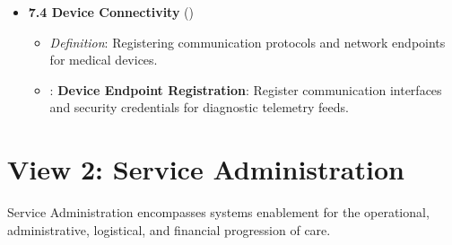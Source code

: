 \begin{itemize}
\begin{itemize}
\item
\texttt{}: \textbf{Device-Patient/\allowbreak{}Location Assignment}: Track dynamic association between a telemetry monitor, patient, and physical bed.



\end{itemize}


\item
\textbf{7.4 Device Connectivity} (\texttt{})


\begin{itemize}

\item
\emph{Definition}: Registering communication protocols and network endpoints for medical devices.



\item
\texttt{}: \textbf{Device Endpoint Registration}: Register communication interfaces and security credentials for diagnostic telemetry feeds.



\end{itemize}


\end{itemize}
\label{rad:enabling:234}

\par\smallskip
{}\label{rad:enabling:236}
\section*{View 2: Service Administration}
\label{rad:enabling:238}

Service Administration encompasses systems enablement for the operational, administrative, logistical, and financial progression of care.

\label{rad:enabling:240}

